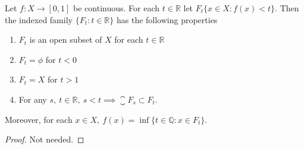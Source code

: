 \begin{lemma}
	Let \( f : X \to [0,1] \) be continuous.
	For each \( t \in \mathbb{R} \) let \( F_t  \{ x \in X : f(x) < t \} \).
	Then the indexed family \( \{F_t : t \in \mathbb{R} \} \) has the following properties
	\begin{enumerate}
		\item \( F_t \) is an open subset of \( X \) for each \( t \in \mathbb{R} \)
		\item \( F_t = \phi \) for \( t < 0 \)
		\item \( F_t = X \) for \( t > 1 \)
		\item For any \( s,\ t \in \mathbb{R},\ s < t \implies \closure{F_s} \subset F_t \).
	\end{enumerate}
	Moreover, for each \( x \in X,\ f(x) = \inf \{t \in \mathbb{Q} : x \in F_t \} \).
\end{lemma}
\begin{proof}
	Not needed.
\end{proof}

